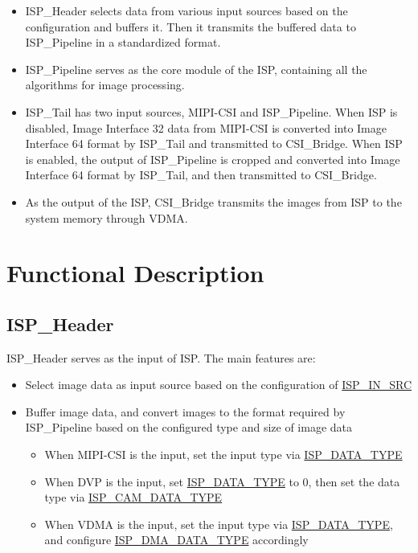 \documentclass[main\_\_EN.tex]{subfiles}
\begin{document}
\begin{itemize}
    \item ISP\_Header selects data from various input sources based on the configuration and buffers it. Then it transmits the buffered data to ISP\_Pipeline in a standardized format.
    \item ISP\_Pipeline serves as the core module of the ISP, containing all the algorithms for image processing.
    \item ISP\_Tail has two input sources, MIPI-CSI and ISP\_Pipeline. When ISP is disabled, Image Interface 32 data from MIPI-CSI is converted into Image Interface 64 format by ISP\_Tail and transmitted to CSI\_Bridge. When ISP is enabled, the output of ISP\_Pipeline is cropped and converted into Image Interface 64 format by ISP\_Tail, and then transmitted to CSI\_Bridge.
    \item As the output of the ISP, CSI\_Bridge transmits the images from ISP to the system memory through VDMA.
\end{itemize}



\section{Functional Description}
\label{sec:isp-func-descr}
\subsection{ISP\_Header}
ISP\_Header serves as the input of ISP. The main features are:
\begin{itemize}
    \item Select image data as input source based on the configuration of \hyperref[fielddesc:ISPINSRC]{ISP\_IN\_SRC}
    \item Buffer image data, and convert images to the format required by ISP\_Pipeline based on the configured type and size of image data
    \begin{itemize}
        \item When MIPI-CSI is the input, set the input type via \hyperref[fielddesc:ISPDATATYPE]{ISP\_DATA\_TYPE}
        \item When DVP is the input, set \hyperref[fielddesc:ISPDATATYPE]{ISP\_DATA\_TYPE} to 0, then set the data type via \hyperref[fielddesc:ISPCAMDATATYPE]{ISP\_CAM\_DATA\_TYPE}
        \item When VDMA is the input, set the input type via \hyperref[fielddesc:ISPDATATYPE]{ISP\_DATA\_TYPE}, and configure \hyperref[fielddesc:ISPDMADATATYPE]{ISP\_DMA\_DATA\_TYPE} accordingly
    \end{itemize}
\end{itemize}
\end{document}
